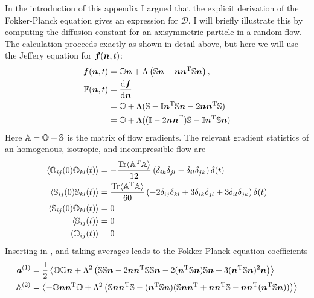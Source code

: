 \documentclass[thesis.tex]{subfiles}
\begin{document}
In the introduction of this appendix I argued that the explicit derivation of the Fokker-Planck equation gives an expression for $\mathcal D$. I will briefly illustrate this by computing the diffusion constant for an axisymmetric particle in a random flow. The calculation proceeds exactly as shown in detail above, but here we will use the Jeffery equation for $\mbox{\boldmath$f$}(\mbox{\boldmath$n$}, t)$:
\begin{align}
	\ve f(\ve n, t) &= \ma O \ve n + \Lambda\left(\ma S \ve n - \ve n \ve n\transpose\ma S \ve n\right), \nn\\
	\ma F(\ve n, t) &= \frac{\rd \ve f}{\rd \ve n} \nn\\
	&= \ma O + \Lambda(\ma S - \maid \ve n\transpose \ma S \ve n - 2\ve n\ve n\transpose \ma S) \nn\\
	& = \ma O + \Lambda( (\maid - 2\ve n \ve n\transpose)\ma S - \maid \ve n\transpose \ma S \ve n )\eqnlab{fjeffery}
\end{align}
Here $\mathbb{A} = \mathbb{O} + \mathbb{S}$ is the matrix of flow gradients.
The relevant gradient statistics of an homogenous, isotropic, and incompressible flow are
\begin{align}
	\left \langle \ma O_{ij}(0)\ma O_{kl}(t)\right \rangle &= -\frac{\tr\langle\ma A\transpose\ma A\rangle}{12}\left(\delta_{ik}\delta_{jl}-\delta_{il}\delta_{jk}\right)\delta(t)\nn\\
	\left \langle \ma S_{ij}(0)\ma S_{kl}(t)\right \rangle &= \frac{\tr\langle\ma A\transpose\ma A\rangle}{60}\left(-2\delta_{ij}\delta_{kl}+3\delta_{ik}\delta_{jl}+3\delta_{il}\delta_{jk}\right)	\delta(t)\nn\\
	\left \langle \ma S_{ij}(0)\ma O_{kl}(t)\right \rangle &= 0 \nn\\
	\left \langle \ma S_{ij}(t)\right \rangle &= 0 \nn\\
	\left \langle \ma O_{ij}(t)\right \rangle &= 0 \eqnlab{appisotropicos}
\end{align}
Inserting  in , and taking averages leads to the Fokker-Planck equation coefficients
\begin{align*}
	\mbox{\boldmath$a$}^{(1)} &= \frac{1}{2}\left \langle \mathbb{O} \mathbb{O} \mbox{\boldmath$n$} + \Lambda^2\left(
\mathbb{S} \mathbb{S} \mbox{\boldmath$n$}
-2 \mbox{\boldmath$n$} \mbox{\boldmath$n$}^{\mathrm T} \mathbb{S}\mathbb{S}\mbox{\boldmath$n$}
-2 (\mbox{\boldmath$n$}^{\mathrm T} \mathbb{S}\mbox{\boldmath$n$})\mathbb{S} \mbox{\boldmath$n$} 
+3 (\mbox{\boldmath$n$}^{\mathrm T} \mathbb{S}\mbox{\boldmath$n$})^2 \mbox{\boldmath$n$}
\right) \right\rangle\\
\mathbb{A}^{(2)}  &= \left\langle -\mathbb{O} \mbox{\boldmath$n$} \mbox{\boldmath$n$}^{\mathrm T} \mathbb{O} + \Lambda^2\left( \mathbb{S} \mbox{\boldmath$n$} \mbox{\boldmath$n$}^{\mathrm T}\mathbb{S} -(\mbox{\boldmath$n$}^{\mathrm T} \mathbb{S} \mbox{\boldmath$n$})(\mathbb{S} \mbox{\boldmath$n$} \mbox{\boldmath$n$}^{\mathrm T} + \mbox{\boldmath$n$} \mbox{\boldmath$n$}^{\mathrm T} \mathbb{S} - \mbox{\boldmath$n$} \mbox{\boldmath$n$}^{\mathrm T}(\mbox{\boldmath$n$}^{\mathrm T} \mathbb{S} \mbox{\boldmath$n$}))\right) \right\rangle
\end{align*}
\end{document}
